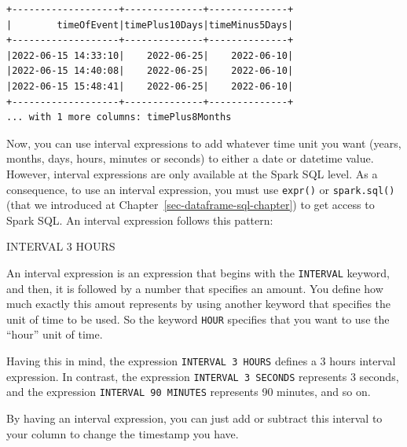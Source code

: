 \documentclass[
  11pt,
  letterpaper,
  DIV=11,
  numbers=noendperiod]{scrreprt}
\newenvironment{Shaded}{\begin{snugshade}}{\end{snugshade}}
\newcommand{\DataTypeTok}[1]{\textcolor[rgb]{0.68,0.00,0.00}{#1}}
\newcommand{\DecValTok}[1]{\textcolor[rgb]{0.68,0.00,0.00}{#1}}
\newcommand{\NormalTok}[1]{\textcolor[rgb]{0.00,0.23,0.31}{#1}}
\begin{document}
\begin{verbatim}
+-------------------+--------------+--------------+
|        timeOfEvent|timePlus10Days|timeMinus5Days|
+-------------------+--------------+--------------+
|2022-06-15 14:33:10|    2022-06-25|    2022-06-10|
|2022-06-15 14:40:08|    2022-06-25|    2022-06-10|
|2022-06-15 15:48:41|    2022-06-25|    2022-06-10|
+-------------------+--------------+--------------+
... with 1 more columns: timePlus8Months
\end{verbatim}

Now, you can use interval expressions to add whatever time unit you want
(years, months, days, hours, minutes or seconds) to either a date or
datetime value. However, interval expressions are only available at the
Spark SQL level. As a consequence, to use an interval expression, you
must use \texttt{expr()} or \texttt{spark.sql()} (that we introduced at
Chapter~\ref{sec-dataframe-sql-chapter}) to get access to Spark SQL. An
interval expression follows this pattern:

\begin{Shaded}
\begin{Highlighting}[]
\DataTypeTok{INTERVAL} \DecValTok{3}\NormalTok{ HOURS}
\end{Highlighting}
\end{Shaded}

An interval expression is an expression that begins with the
\texttt{INTERVAL} keyword, and then, it is followed by a number that
specifies an amount. You define how much exactly this amout represents
by using another keyword that specifies the unit of time to be used. So
the keyword \texttt{HOUR} specifies that you want to use the ``hour''
unit of time.

Having this in mind, the expression \texttt{INTERVAL\ 3\ HOURS} defines
a 3 hours interval expression. In contrast, the expression
\texttt{INTERVAL\ 3\ SECONDS} represents 3 seconds, and the expression
\texttt{INTERVAL\ 90\ MINUTES} represents 90 minutes, and so on.

By having an interval expression, you can just add or subtract this
interval to your column to change the timestamp you have.
\end{document}
